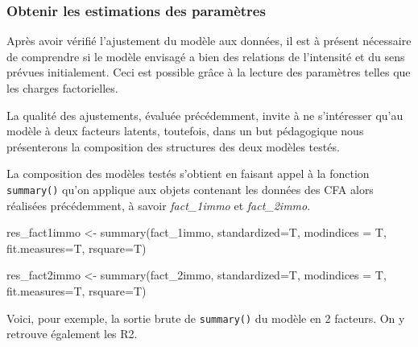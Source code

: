 \documentclass[
  french,
  11pt,
  a4paper,
]{article}
\newenvironment{Shaded}{}{}
\newcommand{\AttributeTok}[1]{\textcolor[rgb]{0.84,0.23,0.29}{#1}}
\newcommand{\FunctionTok}[1]{\textcolor[rgb]{0.44,0.26,0.76}{#1}}
\newcommand{\NormalTok}[1]{\textcolor[rgb]{0.14,0.16,0.18}{#1}}
\newcommand{\OtherTok}[1]{\textcolor[rgb]{0.44,0.26,0.76}{#1}}
\begin{document}
\subsubsection{Obtenir les estimations des
paramètres}\label{obtenir-les-estimations-des-paramuxe8tres}

Après avoir vérifié l'ajustement du modèle aux données, il est à présent
nécessaire de comprendre si le modèle envisagé a bien des relations de
l'intensité et du sens prévues initialement. Ceci est possible grâce à
la lecture des paramètres telles que les charges factorielles.

La qualité des ajustements, évaluée précédemment, invite à ne
s'intéresser qu'au modèle à deux facteurs latents, toutefois, dans un
but pédagogique nous présenterons la composition des structures des deux
modèles testés.

La composition des modèles testés s'obtient en faisant appel à la
fonction \texttt{summary()} qu'on applique aux objets contenant les
données des CFA alors réalisées précédemment, à savoir
\emph{fact\_1immo} et \emph{fact\_2immo}.

\begin{Shaded}
\begin{Highlighting}[]
\NormalTok{res\_fact1immo }\OtherTok{\textless{}{-}} \FunctionTok{summary}\NormalTok{(fact\_1immo, }\AttributeTok{standardized=}\NormalTok{T, }\AttributeTok{modindices =}\NormalTok{ T, }\AttributeTok{fit.measures=}\NormalTok{T, }\AttributeTok{rsquare=}\NormalTok{T)}

\NormalTok{res\_fact2immo }\OtherTok{\textless{}{-}} \FunctionTok{summary}\NormalTok{(fact\_2immo, }\AttributeTok{standardized=}\NormalTok{T, }\AttributeTok{modindices =}\NormalTok{ T, }\AttributeTok{fit.measures=}\NormalTok{T, }\AttributeTok{rsquare=}\NormalTok{T)}
\end{Highlighting}
\end{Shaded}

Voici, pour exemple, la sortie brute de \texttt{summary()} du modèle en
2 facteurs. On y retrouve également les R2.
\end{document}
